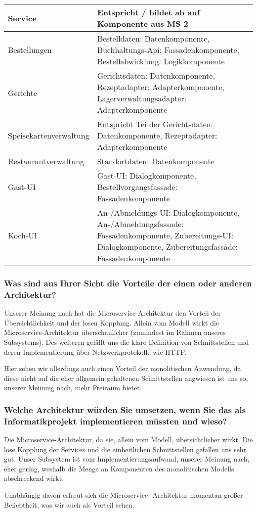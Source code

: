 \begin{tabu} to 
\hline{}
Service &Entspricht / bildet ab auf Komponente aus MS 2 \\
\hline
Bestellungen &Bestelldaten: Datenkomponente,
  Buchhaltungs-Api: Fassadenkomponente,
  Bestellabwicklung: Logikkomponente
  \\
\hline
Gerichte &Gerichtsdaten: Datenkomponente,
  Rezeptadapter: Adapterkomponente,
  Lagerverwaltungsadapter: Adapterkomponente
  \\
\hline
Speisekartenver\-waltung &Entspricht Tei der Gerichtsdaten:
  Datenkomponente, Rezeptadapter: Adapterkomponente \\
\hline
Restaurantver\-waltung &Standortdaten: Datenkomponente \\
\hline
Gast-UI &Gast-UI: Dialogkomponente,
  Bestellvorgangsfassade: Fassadenkomponente \\
\hline
Koch-UI &An-/Abmeldungs-UI: Dialogkomponente,
  An-/Abmeldungsfassade: Fassadenkomponente,
  Zubereitungs-UI: Dialogkomponente,
  Zubereitungsfassade: Fassadenkomponente
  \\
\hline
\end{tabu}

\subsubsection*{Was sind aus Ihrer Sicht die Vorteile der
  einen oder anderen Architektur?}

Unserer Meinung nach hat die Microservice-Architektur den
Vorteil der \"Ubersichtlichkeit und der losen Kopplung.
Allein vom Modell wirkt die Microservice-Architektur
\"uberschaulicher (zumindest im Rahmen unseres Subsystems).
Des weiteren gef\"allt uns die klare Definition von
Schnittstellen und deren Implementierung \"uber
Netzwerkprotokolle wie HTTP.

Hier sehen wir allerdings auch einen Vorteil der
monolitischen Anwendung, da diese nicht auf die eher
allgemein gehaltenen Schnittstellen angwiesen ist uns so,
unserer Meinung nach, mehr Freiraum bietet.

\subsubsection*{Welche Architektur w\"urden Sie umsetzen,
  wenn Sie das als Informatikprojekt implementieren
  m\"ussten und wieso?}

Die Microservice-Architektur, da sie, allein vom Modell,
\"ubersichtlicher wirkt. Die lose Kopplung der Services und
die einheitlichen Schnittstellen gefallen uns sehr gut.
Unser Subsystem ist vom Implementierungsaufwand, unserer
Meinung nach, eher gering, weshalb die Menge an Komponenten
des monolitischen Modells abschreckend wirkt.

Unabh\"angig davon erfreut sich die Microservice-
Architektur momentan gro{\ss}er Beliebtheit, was wir auch
als Vorteil sehen.
